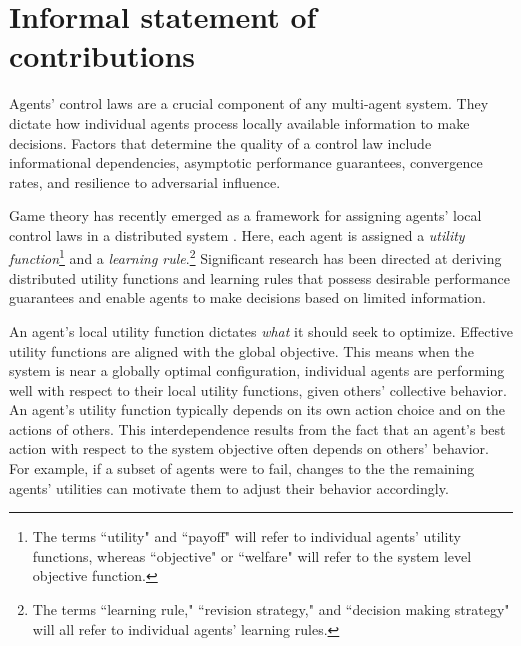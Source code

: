\section{Informal statement of contributions}

Agents' control laws are a crucial component of any multi-agent system. They dictate how individual agents process locally available information to make decisions. Factors that determine the quality of a control law include informational dependencies, asymptotic performance guarantees, convergence rates, and resilience to adversarial influence.

Game theory has recently emerged as a framework for assigning agents' local control laws in a distributed system \cite{Marden2008, Zhu2009, Goto2010, Staudigle2012, Fox2010, Lasaulce2011, Alpcan2010, Han2012, MacKenzie2006, Menache2011}. Here, each agent is assigned a {\it utility function}\footnote{The terms ``utility" and ``payoff" will refer to individual agents' utility functions, whereas ``objective" or ``welfare" will refer to the system level objective function.} and a {\it learning rule}.\footnote{The terms ``learning rule," ``revision strategy," and ``decision making strategy" will all refer to individual agents' learning rules.} Significant research has been directed at deriving distributed utility functions and learning rules that possess desirable performance guarantees and enable agents to make decisions based on limited information.





An agent's local utility function dictates {\it what} it should seek to optimize. Effective utility functions are aligned with the global objective. This means when the system is near a globally optimal configuration, individual agents are performing well with respect to their local utility functions, given others' collective behavior.  An agent's utility function typically depends on its own action choice and on the actions of others. This interdependence results from the fact that an agent's best action with respect to the system objective often depends on others' behavior. For example, if a subset of agents were to fail, changes to the the remaining agents' utilities can motivate them to adjust their behavior accordingly.

